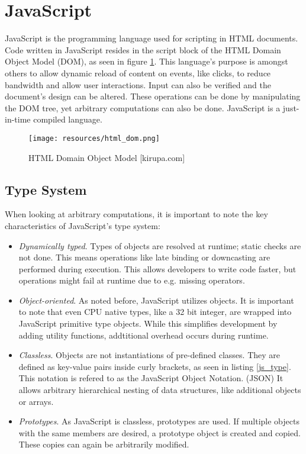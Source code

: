 \section{JavaScript} \label{chapter_javascript}

JavaScript is the programming language used for scripting in HTML documents. Code written in JavaScript resides in the script block of the HTML Domain Object Model (DOM), as seen in figure \ref{fig:htmldom}. This language's purpose is amongst others to allow dynamic reload of content on events, like clicks, to reduce bandwidth and allow user interactions. Input can also be verified and the document's design can be altered. These operations can be done by manipulating the DOM tree, yet arbitrary computations can also be done. JavaScript is a just-in-time compiled language.

\begin{figure}[htp]
  \begin{center}
    \texttt{[image: resources/html\_dom.png]}
  \end{center}
  \caption{HTML Domain Object Model [kirupa.com]}
  \label{fig:htmldom}
\end{figure}


\subsection{Type System}

When looking at arbitrary computations, it is important to note the key characteristics of JavaScript's type system:

\begin{itemize}

\item \textit{Dynamically typed}. Types of objects are resolved at runtime; static checks are not done. This means operations like late binding or downcasting are performed during execution. This allows developers to write code faster, but operations might fail at runtime due to e.g. missing operators.

\item \textit{Object-oriented}. As noted before, JavaScript utilizes objects. It is important to note that even CPU native types, like a 32 bit integer, are wrapped into JavaScript primitive type objects. While this simplifies development by adding utility functions, addtitional overhead occurs during runtime.

\item \textit{Classless}. Objects are not instantiations of pre-defined classes. They are defined as key-value pairs inside curly brackets, as seen in listing \ref{js_type}. This notation is refered to as the JavaScript Object Notation. (JSON) It allows arbitrary hierarchical nesting of data structures, like additional objects or arrays.

\item \textit{Prototypes}. As JavaScript is classless, prototypes are used. If multiple objects with the same members are desired, a prototype object is created and copied. These copies can again be arbitrarily modified.

\end{itemize}

